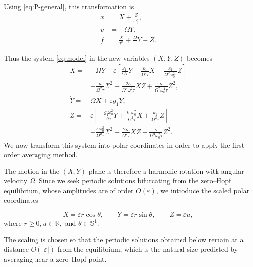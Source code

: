 \documentclass[11pt,reqno]{amsart}
\theoremstyle{plain}
\theoremstyle{definition}
\theoremstyle{remark}
\begin{document}
Using \eqref{eq:P-general}, this transformation is 
\begin{equation}
\label{eq:change-general}
\begin{aligned}
x&=X+\frac{Z}{\omega_0^2},\\[2mm]
v&=-\Omega Y,\\[2mm]
f&=\frac{X}{\tau^2}
+\frac{\Omega}{\tau}Y+Z.
\end{aligned}
\end{equation}

Thus the system
\eqref{eq:model} in the new variables $(X, Y, Z)$ becomes 
\begin{equation}
\label{eq:expanded-XYZ-system}
\begin{aligned}
\dot X
={}&
-\Omega Y
+\varepsilon
\left[
\frac{g_1}{\Omega\tau}Y
-\frac{k_1}{\Omega^2\tau}X
-\frac{k_1}{\Omega^2\omega_0^2\tau}Z
\right]
\\
&+
\frac{\kappa}{\Omega^2\tau}X^2
+\frac{2\kappa}{\Omega^2\omega_0^2\tau}XZ
+\frac{\kappa}{\Omega^2\omega_0^4\tau}Z^2,
\\[2mm]
\dot Y
={}&
\Omega X+\varepsilon g_1Y,
\\[2mm]
\dot Z
={}&
\varepsilon
\left[
-\frac{g_1\omega_0^2}{\Omega\tau}Y
+\frac{k_1\omega_0^2}{\Omega^2\tau}X
+\frac{k_1}{\Omega^2\tau}Z
\right]
\\
&-
\frac{\kappa\omega_0^2}{\Omega^2\tau}X^2
-\frac{2\kappa}{\Omega^2\tau}XZ
-\frac{\kappa}{\Omega^2\omega_0^2\tau}Z^2.
\end{aligned}
\end{equation}
We now transform this system into
polar coordinates in order to apply the first-order averaging method.

The motion in the $(X,Y)$-plane is therefore a harmonic rotation with
angular velocity $\Omega$. Since we seek periodic solutions
bifurcating from the zero--Hopf equilibrium, whose amplitudes are of
order $O(\varepsilon)$, we introduce the scaled polar coordinates

\begin{equation}
\label{eq:polar-transformation}
X=\varepsilon r\cos\theta,
\qquad
Y=\varepsilon r\sin\theta,
\qquad
Z=\varepsilon u,
\end{equation}
where
$
r\ge0,
u\in\mathbb R,
$ and 
$\theta\in\mathbb S^1.
$

The scaling is chosen so that the periodic solutions obtained below
remain at a distance $O(|\varepsilon|)$ from the equilibrium, which is
the natural size predicted by averaging near a zero--Hopf point.
\end{document}
